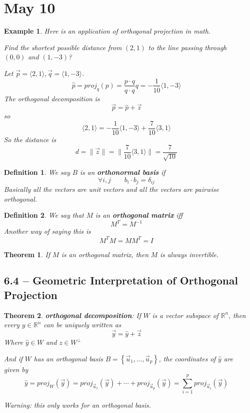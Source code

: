 \documentclass[11pt]{article}
\newtheorem{thm}{Theorem}
\newtheorem{defn}{Definition}
\newtheorem{ex}{Example}
\begin{document}
\section{May 10}
\begin{ex}
  Here is an application of orthogonal projection in math.

  Find the shortest possible distance from $(2,1)$ to the line passing through $(0,0)$ and $(1,-3)$?

  Let $\vec{p} = \langle 2,1 \rangle, \vec{q} = \langle 1, -3\rangle$.
  \[\hat{p} = proj_{q}(p) = \frac{p\cdot q}{q \cdot q} q = -\frac{1}{10}\langle 1 , -3\rangle\]
  The orthogonal decomposition is
  \[\vec{p} = \hat{p} + \vec{z}\]
  so
  \[\langle 2 , 1 \rangle = -\frac{1}{10}\langle 1, -3 \rangle + \frac{7}{10}\langle 3 , 1 \rangle\]
  So the distance is
  \[d = \|\vec{z} \| = \|\frac{7}{10}\langle 3, 1 \rangle\| = \frac{7}{\sqrt{10}}\]
\end{ex}

\begin{defn}
  We say $B$ is an \textbf{orthonormal basis} if
  \[\forall i,j \qquad b_{i}\cdot b_{j} = \delta_{ij}\]
  Basically all the vectors are unit vectors and all the vectors are pairwise orthogonal.

\end{defn}

\begin{defn}
  We say that $M$ is an \textbf{orthogonal matrix} iff
  \[M^{T}=M^{-1}\]
  Another way of saying this is
  \[M^{T}M=MM^{T}=I\]
\end{defn}
\begin{thm}
  If $M$ is an orthogonal matrix, then $M$ is always invertible.
\end{thm}
\subsection{6.4 -- Geometric Interpretation of Orthogonal Projection}
\begin{thm}
  \textbf{orthogonal decomposition}:
  If $W$ is a vector subspace of $\mathbb{R}^{n}$, then every $y \in \mathbb{R}^{n}$ can be uniquely written as
  \[\vec{y} = \hat{y} + \vec{z}\]
  Where $\hat{y} \in W$ and $z \in W^{\bot}$

  And if $W$ has an orthogonal basis $B = \left\{\vec{u}_{1}, \ldots, \vec{u}_{p}\right\}$, the coordinates of $\hat{y}$
  are given by
  \[\hat{y} = proj_{W}(\vec{y}) = proj_{\vec{u}_{1}}(\vec{y}) + \cdots + proj_{\vec{u}_{p}}(\vec{y}) = \sum_{i=1}^{p}proj_{\vec{u}_{i}}(\vec{y})\]

  Warning: this only works for an orthogonal basis.
\end{thm}
\end{document}
